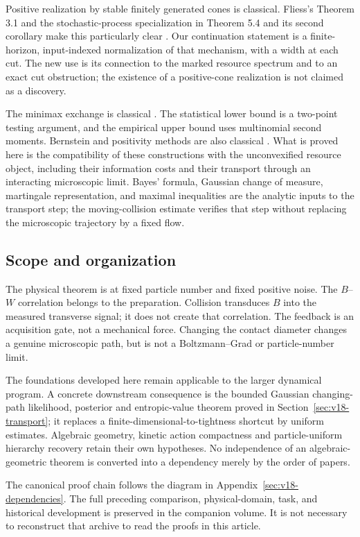 Positive realization by stable finitely generated cones is classical.
Fliess's Theorem 3.1 and the stochastic-process specialization in
Theorem 5.4 and its second corollary make this particularly clear
\cite{Fliess1975}. Our continuation statement is a finite-horizon,
input-indexed normalization of that mechanism, with a width at each cut.
The new use is its connection to the marked resource spectrum and to an
exact cut obstruction; the existence of a positive-cone realization is
not claimed as a discovery.

The minimax exchange is classical \cite{Sion1958}. The statistical lower
bound is a two-point testing argument, and the empirical upper bound uses
multinomial second moments. Bernstein and positivity methods are also
classical \cite{deKlerkLaurent2010,LaurentSlot2023,deKlerkVera2026}.
What is proved here is the compatibility of these constructions with the
unconvexified resource object, including their information costs and their
transport through an interacting microscopic limit. Bayes' formula,
Gaussian change of measure, martingale representation, and maximal
inequalities are the analytic inputs to the transport step; the
moving-collision estimate verifies that step without replacing the
microscopic trajectory by a fixed flow.

\subsection{Scope and organization}
The physical theorem is at fixed particle number and fixed positive noise.
The $B$--$W$ correlation belongs to the preparation. Collision transduces
$B$ into the measured transverse signal; it does not create that correlation.
The feedback is an acquisition gate, not a mechanical force. Changing the
contact diameter changes a genuine microscopic path, but is not a
Boltzmann--Grad or particle-number limit.

The foundations developed here remain applicable to the larger dynamical
program. A concrete downstream consequence is the bounded Gaussian
changing-path likelihood, posterior and entropic-value theorem proved in
Section~\ref{sec:v18-transport}; it replaces a finite-dimensional-to-tightness
shortcut by uniform estimates. Algebraic geometry, kinetic action
compactness and particle-uniform hierarchy recovery retain their own
hypotheses. No independence of an algebraic-geometric theorem is converted
into a dependency merely by the order of papers.

The canonical proof chain follows the diagram in
Appendix~\ref{sec:v18-dependencies}. The full preceding comparison,
physical-domain, task, and historical development is preserved in the
companion volume. It is not necessary to reconstruct that archive to read
the proofs in this article.
